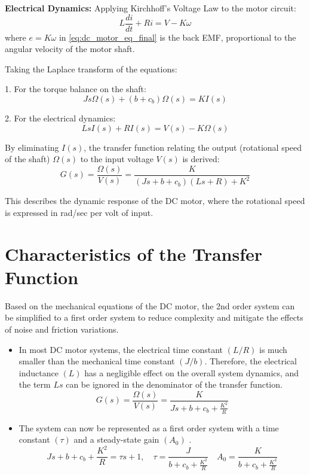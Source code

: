\smallskip
\noindent \textbf{Electrical Dynamics:} Applying Kirchhoff's Voltage Law to the motor circuit:
\begin{equation}
    L\frac{d i}{dt} + R i = V - K \omega
    \label{eq:dc_motor_eq_final}
\end{equation}
where $e = K \omega$ in \eqref{eq:dc_motor_eq_final} is the back EMF, proportional to the angular velocity of the 
motor shaft.

Taking the Laplace transform of the equations:

1. For the torque balance on the shaft:
\begin{equation}
    J s \Omega(s) + (b + c_b) \Omega(s) = K I(s)
    \label{eq:shaft_eq_final_laplace}
\end{equation}

2. For the electrical dynamics:
\begin{equation}
    L s I(s) + R I(s) = V(s) - K \Omega(s)
    \label{eq:Kirchhoff_eq_final_laplace}
\end{equation}

By eliminating $I(s)$, the transfer function relating the output (rotational speed of the shaft) $\Omega(s)$ to the 
input voltage $V(s)$ is derived:
\begin{equation}
    G(s) = \frac{\Omega(s)}{V(s)} = \frac{K}{(J s + b + c_b)(L s + R) + K^2}
    \label{eq:2nd_st_order_TF}
\end{equation}

This describes the dynamic response of the DC motor, where the rotational speed is expressed in rad/sec per volt of 
input.

\section{Characteristics of the Transfer Function}
Based on the mechanical equations of the DC motor, the 2nd order system can be simplified to a first order system to reduce complexity and mitigate the effects of noise and friction variations.
\begin{itemize}
    \item In most DC motor systems, the electrical time constant $(L/R)$ is much smaller than the mechanical time constant $(J/b)$. Therefore, the electrical inductance $(L)$ has a negligible effect on the overall system dynamics, and the term 
    $Ls$ can be ignored in the denominator of the transfer function.
    \begin{equation}
        G(s) = \frac{\Omega(s)}{V(s)} = \frac{K}{J s + b + c_b + \frac{K^2}{R}}
        \label{eq:2nd_to_1st_order_TF}
    \end{equation}
    \item The system can now be represented as a first order system with a time constant $(\tau)$ and a steady-state gain $(A_0)$ .
    \begin{equation}
    {J s + b + c_b + \frac{K^2}{R}} = {\tau s + 1}, \quad \tau = \frac{J}{b + c_b + \frac{K^2}{R}} \quad A_0 = \frac{K}{b + c_b + \frac{K^2}{R}}
    \label{eq:tao_eq}
    \end{equation}
\end{itemize}

